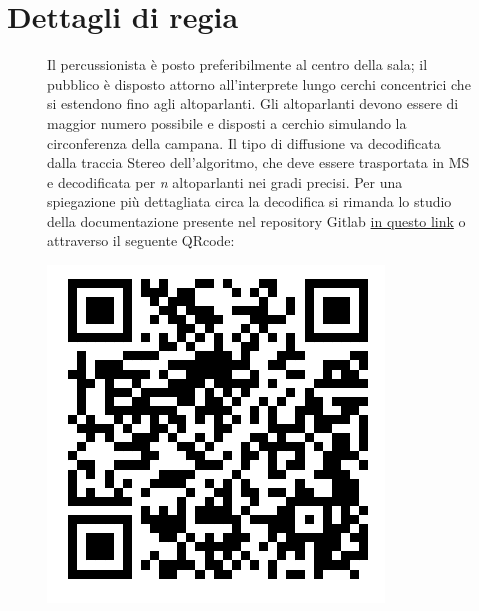 \documentclass{book}
\begin{document}
\def\circleRadius{11cm}  %
\def\numCards{11}  %
\def\angleOffset{30}  %
\def\pointWidth{3pt}
\def\minimumSize{1.5pt}
\def\arrowWidth{6pt}
\def\arrowLength{9pt}
\def\sumWidth{1pt}
\def\lineWidthMore{3pt}
\def\lineWidthMedium{\lineWidthMore-1.5}
\def\lineWidth{\lineWidthMore-2.5pt}
\def\arrowWidthMore{9pt}
\def\arrowLengthMore{12pt}
\def\sumWidthMore{3pt}
\def\roundedCorners{8pt}
\def\cardRadius{2.1cm} 
\def\cardRadiusTwo{\cardRadius + .5cm} 
\def\battenteheight{.25}
\def\battentewidth{1.3}



\section*{\centering Dettagli di regia}
\begin{figure}[htbp]
    \begin{minipage}{0.75\textwidth}
        Il percussionista è posto preferibilmente al centro della sala; il pubblico è disposto attorno all'interprete lungo cerchi concentrici che si estendono fino agli altoparlanti.
        Gli altoparlanti devono essere di maggior numero possibile e disposti a cerchio simulando la circonferenza della campana.
        Il tipo di diffusione va decodificata dalla traccia Stereo dell'algoritmo, che deve essere trasportata in MS e decodificata per \textit{n} altoparlanti nei gradi precisi. 
        Per una spiegazione più dettagliata circa la decodifica si rimanda lo studio della documentazione presente nel repository Gitlab \href{https://gitlab.com/GiulioDeMattia/midside}{in questo link}
        o attraverso il seguente QRcode:
    \end{minipage}
    \hfill
    \begin{minipage}{1\textwidth}
        \includegraphics[width=0.2\linewidth]{0-qrcodeSrcLE.pdf}
    \end{minipage}
\end{figure}
\end{document}
